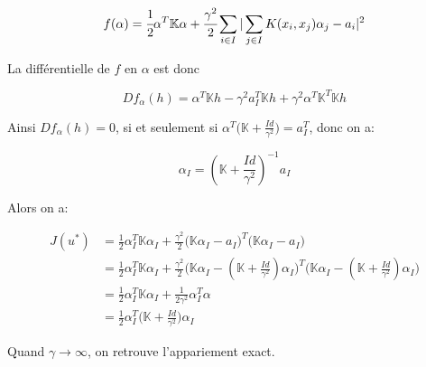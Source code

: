 \documentclass[11pt]{article}
\begin{document}
    \vspace{-2em}
    $$
      f(\alpha) = \cfrac{1}{2} \alpha^T \mathbb{K} \alpha + \cfrac{\gamma^2}{2} \sum_{i \in I} |\sum_{j \in I} K(x_i, x_j)\alpha_j - a_i|^2 
    $$
    \vspace{-2em}

    La différentielle de $f$ en $\alpha$ est donc 

    \vspace{-2em}
    $$
      Df_\alpha(h) = \alpha^T \mathbb{K} h - \gamma^2 a_I^T \mathbb{K} h  + \gamma^2 \alpha^T \mathbb{K}^T \mathbb{K} h
    $$
    \vspace{-3em}

    Ainsi $Df_\alpha(h) = 0$, si et seulement si $\alpha^T \big (\mathbb{K} + \frac{Id}{\gamma^2} \big ) = a_I^T$, donc on a:

    \vspace{-2em}
    $$
    \alpha_I = (\mathbb{K} + \frac{Id}{\gamma^2})^{-1} a_I
    $$
    \vspace{-3em}

    Alors on a:

    \vspace{-4em}
    \begin{align*}
      J(u^*) &= \frac{1}{2} \alpha_I^T \mathbb{K} \alpha_I + \frac{\gamma^2}{2} \big ( \mathbb{K} \alpha_I - a_I \big )^T \big ( \mathbb{K} \alpha_I - a_I \big ) \\
      &= \frac{1}{2} \alpha_I^T \mathbb{K} \alpha_I + \frac{\gamma^2}{2} \Big (\mathbb{K} \alpha_I - (\mathbb{K} + \frac{Id}{\gamma^2}) \alpha_I \Big )^T \Big (\mathbb{K} \alpha_I - (\mathbb{K} + \frac{Id}{\gamma^2}) \alpha_I \Big )\\
      &= \frac{1}{2} \alpha_I^T \mathbb{K} \alpha_I + \frac{1}{2 \gamma^2} \alpha_I^T \alpha \\ 
      &= \frac{1}{2} \alpha_I^T \Big ( \mathbb{K} + \frac{Id}{\gamma^2} \Big ) \alpha_I
    \end{align*}
    \vspace{-4em}

    Quand $\gamma \to \infty$, on retrouve l'appariement exact.

    
\end{document}

